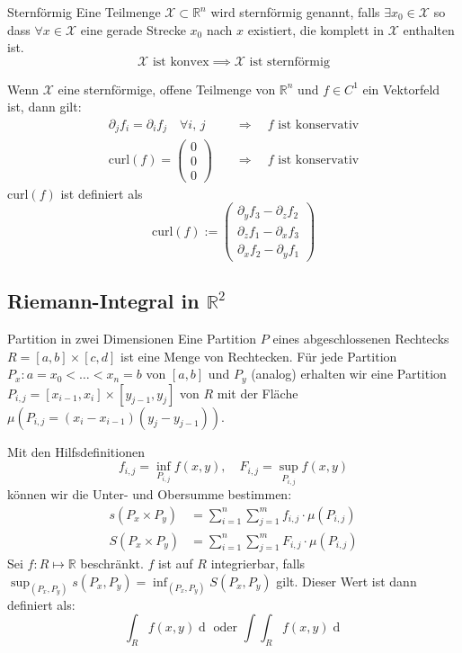 \documentclass[a4paper,10pt]{article}
\def\R{\mathbb{R}}
\def\X{\mathcal{X}}
\begin{document}
\begin{subbox}{Sternförmig}
    Eine Teilmenge $\X \subset \R^n$ wird sternförmig genannt, falls $\exists x_0 \in \X$ so dass $\forall x \in \X$ eine gerade Strecke $x_0$ nach $x$ existiert, die komplett in $\X$ enthalten ist. 
    $$\X \text{ ist konvex} \implies \X \text{ ist sternförmig}$$
\end{subbox}
Wenn $\X$ eine sternförmige, offene Teilmenge von $\R^n$ und $f \in C^1$ ein Vektorfeld ist, dann gilt:
\begin{align*}
    \partial_j f_i = \partial_i f_j \quad \forall i,\, j
    \quad & \Rightarrow \quad \text{$f$ ist konservativ} \\
    \text{curl}(f) = \begin{pmatrix}
    0\\0\\0
    \end{pmatrix}
    \quad & \Rightarrow \quad \text{$f$ ist konservativ} 
\end{align*}
$\text{curl}(f)$ ist definiert als
$$\text{curl}(f) := \begin{pmatrix}
\partial_y f_3 - \partial_z f_2 \\
\partial_z f_1 - \partial_x f_3 \\
\partial_x f_2 - \partial_y f_1
\end{pmatrix}$$
\subsection{Riemann-Integral in \texorpdfstring{$\R^2$}{R²}}
\begin{subbox}{Partition in zwei Dimensionen}
    Eine Partition $P$ eines abgeschlossenen Rechtecks $R = \left[a,b\right] \times \left[c,d\right]$ ist eine Menge von Rechtecken. Für jede Partition $P_x : a = x_0 < \ldots < x_n = b$ von $\left[a,b\right]$ und $P_y$ (analog) erhalten wir eine Partition $P_{i,j} = \left[x_{i-1}, x_i\right] \times \left[y_{j-1},y_j\right]$ von $R$ mit der Fläche $\mu({P_{i,j}} = (x_i - x_{i-1})(y_j - y_{j-1}))$.
\end{subbox}
Mit den Hilfsdefinitionen
$$f_{i,j} = \inf_{P_{i,j}} f(x,y), \quad F_{i,j} = \sup_{P_{i,j}} f(x,y)$$
können wir die Unter- und Obersumme bestimmen:
\begin{align*}
    s(P_x \times P_y) & = \sum_{i=1}^n \sum_{j=1}^m f_{i,j} \cdot \mu(P_{i,j}) \\
    S(P_x \times P_y) & = \sum_{i=1}^n \sum_{j=1}^m F_{i,j} \cdot \mu(P_{i,j}) 
\end{align*}
Sei $f: R \mapsto \R$ beschränkt. $f$ ist auf $R$ integrierbar, falls $\sup_{(P_x, P_y)} s(P_x, P_y) = \inf_{(P_x, P_y)} S(P_x, P_y)$ gilt. Dieser Wert ist dann definiert als:
$$\int_R f(x,y) \mathop{d(x,y)} \text{ oder } \int\int_R f(x,y) \mathop{d(x,y)}$$
\end{document}
